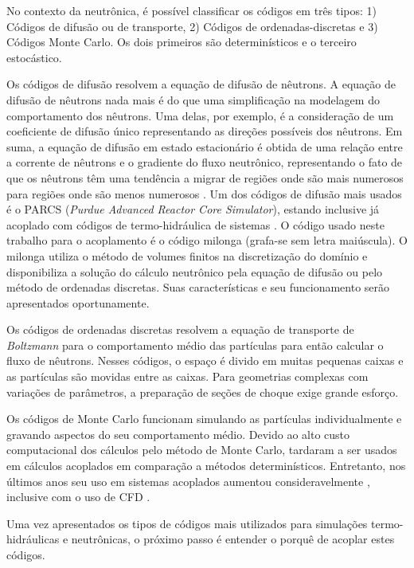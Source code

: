 No contexto da neutrônica, é possível classificar os códigos em três tipos:
1) Códigos de difusão ou de transporte, 
2) Códigos de ordenadas-discretas e 3) Códigos Monte Carlo. Os dois primeiros são determinísticos 
e o terceiro estocástico. 

Os códigos de difusão resolvem a equação de difusão de nêutrons. A equação de difusão de nêutrons nada mais é do
que uma simplificação na modelagem do comportamento dos nêutrons. Uma delas, por exemplo, é a consideração de um
coeficiente de difusão único representando as direções possíveis dos nêutrons. Em suma, a equação de difusão
em estado estacionário é obtida de uma relação entre a corrente de nêutrons e o gradiente do fluxo neutrônico,
representando o fato de que os nêutrons têm uma tendência a migrar de regiões onde são mais numerosos para
regiões onde são menos numerosos \cite{Hebert2009}. Um dos códigos de difusão 
mais usados é o PARCS (\textit{Purdue Advanced Reactor Core Simulator}), estando inclusive já acoplado 
com códigos de termo-hidráulica de sistemas \cite{Xu2006,Barber98}.
O código usado neste trabalho para o acoplamento é o código milonga
(grafa-se sem letra maiúscula). O milonga \cite{Theler2014b}
utiliza o método de volumes finitos na discretização do domínio e disponibiliza a solução
do cálculo neutrônico pela equação de difusão ou pelo método de ordenadas discretas. Suas características e seu
funcionamento serão apresentados oportunamente.

Os códigos de ordenadas discretas resolvem 
a equação de transporte de \textit{Boltzmann} para o comportamento médio das partículas para então calcular o 
fluxo de nêutrons. Nesses códigos, o espaço é divido em muitas pequenas caixas e as partículas 
são movidas entre as caixas. Para geometrias complexas com variações de parâmetros, a preparação de 
seções de choque exige grande esforço.

Os códigos de Monte Carlo funcionam simulando as partículas 
individualmente e gravando aspectos do seu comportamento médio. Devido ao alto custo computacional dos cálculos
pelo método de Monte Carlo, tardaram a ser usados em cálculos acoplados em comparação a métodos determinísticos.
Entretanto, nos últimos anos seu uso em sistemas acoplados aumentou consideravelmente \cite{Herman2015, Richard2015, Bennett2016},
inclusive com o uso de CFD \cite{Leppanen2012}.

Uma vez apresentados os tipos de códigos mais utilizados para simulações termo-hidráulicas
e neutrônicas, o próximo passo é entender o porquê de acoplar estes códigos.

